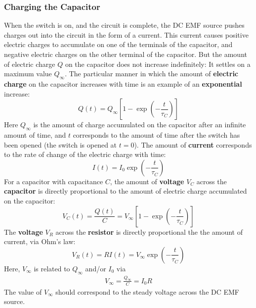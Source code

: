 \subsubsection{Charging the Capacitor}
%
When the switch is on, and the circuit is complete, the DC EMF source pushes charges out into the circuit in the form of a current. This current causes positive electric charges to accumulate on one of the terminals of the capacitor, and negative electric charges on the other terminal of the capacitor. But the amount of electric charge $Q$ on the capacitor does not increase indefinitely: It settles on a maximum value $Q_{\infty}$. The particular manner in which the amount of \textbf{electric charge} on the capacitor increases with time is an example of an \textbf{exponential} increase:
\begin{equation}
    Q(t) = Q_{\infty} \left[ 1 - \exp\left(-\frac{t}{\tau_{C}}\right) \right]
    \label{eq.05.RC.q.charging}
\end{equation}
Here $Q_{\infty}$ is the amount of charge accumulated on the capacitor after an infinite amount of time, and $t$ corresponds to the amount of time after the switch has been opened (the switch is opened at $t = 0$). The amount of \textbf{current} corresponds to the rate of change of the electric charge with time:
\begin{equation}
    I(t) = I_{0} \exp\left(-\frac{t}{\tau_{C}}\right)
    \label{eq.05.RC.i.charging}
\end{equation}
For a capacitor with capacitance $C$, the amount of \textbf{voltage} $V_{C}$ across the \textbf{capacitor} is directly proportional to the amount of electric charge accumulated on the capacitor:
\begin{equation}
    V_{C}(t) = \frac{Q(t)}{C} = V_{\infty} \left[ 1 - \exp\left(-\frac{t}{\tau_{C}}\right) \right]
    \label{eq.05.RC.vC.charging}
\end{equation}
The \textbf{voltage} $V_{R}$ across the \textbf{resistor} is directly proportional the the amount of current, via Ohm's law:
\begin{equation}
    V_{R}(t) = R I(t) = V_{\infty} \exp\left(-\frac{t}{\tau_{C}}\right)
    \label{eq.05.RC.vR.charging}
\end{equation}
Here, $V_{\infty}$ is related to $Q_{\infty}$ and/or $I_{0}$ via
\begin{eqnarray}
    V_{\infty} = \frac{Q_{\infty}}{C} = I_{0} R
\end{eqnarray}
The value of $V_{\infty}$ should correspond to the steady voltage across the DC EMF source.

